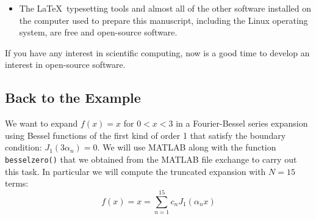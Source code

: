 \begin{itemize}
\item The \LaTeX\ typesetting tools and almost all of the other software installed on the computer used to prepare this manuscript, including the Linux operating system, are free and open-source software. 

\end{itemize}
If you have any interest in scientific computing, now is a good time to develop an interest in open-source software.

\subsection{Back to the Example}
We want to expand $f(x)=x$ for $0<x<3$ in a Fourier-Bessel series expansion using Bessel functions of the first kind of order 1 that satisfy the boundary condition: $J_{1}(3\alpha_n)=0$.  We will use MATLAB along with the function \lstinline[style=myMatlab]{besselzero()} that we obtained from the MATLAB file exchange to carry out this task. In particular we will compute the truncated expansion with $N=15$ terms:
\begin{equation*}
f(x) = x = \sum\limits_{n=1}^{15}c_n J_1\left(\alpha_n x\right)
\end{equation*}


